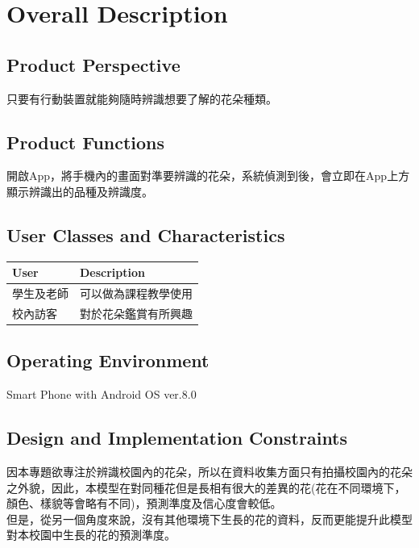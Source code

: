 \documentclass{scrreprt}
\begin{document}
\chapter{Overall Description}

\section{Product Perspective}
\begin{CJK}{UTF8}{bkai}
只要有行動裝置就能夠隨時辨識想要了解的花朵種類。
\end{CJK}

\section{Product Functions}
\begin{CJK}{UTF8}{bkai}
	開啟App，將手機內的畫面對準要辨識的花朵，系統偵測到後，會立即在App上方顯示辨識出的品種及辨識度。
\end{CJK}

\section{User Classes and Characteristics}
\begin{center}
	\begin{CJK}{UTF8}{bkai}
		
		\begin{tabular}{| l | l |}
		\hline
			\rowcolor{gray}User & Description \\ \hline
			學生及老師 & 可以做為課程教學使用  \\ \hline
			校內訪客 & 對於花朵鑑賞有所興趣 \\ \hline
		\end{tabular}
	\end{CJK}
\end{center}

\section{Operating Environment}
Smart Phone with Android OS ver.8.0 

\section{Design and Implementation Constraints}
\begin{CJK}{UTF8}{bkai}
	因本專題欲專注於辨識校園內的花朵，所以在資料收集方面只有拍攝校園內的花朵之外貌，因此，本模型在對同種花但是長相有很大的差異的花(花在不同環境下，顏色、樣貌等會略有不同)，預測準度及信心度會較低。 \\
	但是，從另一個角度來說，沒有其他環境下生長的花的資料，反而更能提升此模型對本校園中生長的花的預測準度。
\end{CJK}
\end{document}
